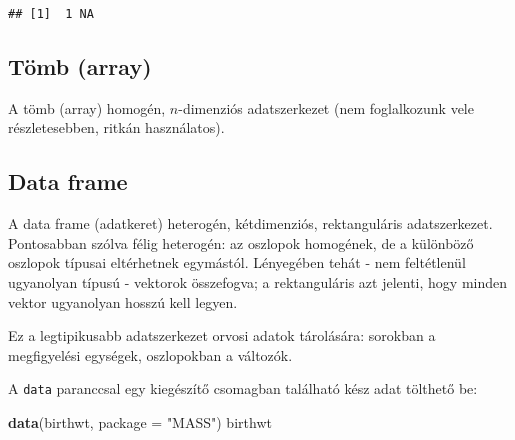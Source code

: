 \documentclass[]{book}
\newenvironment{Shaded}{\begin{snugshade}}{\end{snugshade}}
\newcommand{\KeywordTok}[1]{\textcolor[rgb]{0.13,0.29,0.53}{\textbf{#1}}}
\newcommand{\DataTypeTok}[1]{\textcolor[rgb]{0.13,0.29,0.53}{#1}}
\newcommand{\StringTok}[1]{\textcolor[rgb]{0.31,0.60,0.02}{#1}}
\newcommand{\NormalTok}[1]{#1}
\begin{document}
\begin{verbatim}
## [1]  1 NA
\end{verbatim}

\subsection{Tömb (array)}\label{tomb-array}

A tömb (array) homogén, \(n\)-dimenziós adatszerkezet (nem foglalkozunk
vele részletesebben, ritkán használatos).

\subsection{Data frame}\label{data-frame}

A data frame (adatkeret) heterogén, kétdimenziós, rektanguláris
adatszerkezet. Pontosabban szólva félig heterogén: az oszlopok
homogének, de a különböző oszlopok típusai eltérhetnek egymástól.
Lényegében tehát - nem feltétlenül ugyanolyan típusú - vektorok
összefogva; a rektanguláris azt jelenti, hogy minden vektor ugyanolyan
hosszú kell legyen.

Ez a legtipikusabb adatszerkezet orvosi adatok tárolására: sorokban a
megfigyelési egységek, oszlopokban a változók.

A \texttt{data} paranccsal egy kiegészítő csomagban található kész adat
tölthető be:

\begin{Shaded}
\begin{Highlighting}[]
\KeywordTok{data}\NormalTok{(birthwt, }\DataTypeTok{package =} \StringTok{"MASS"}\NormalTok{)}
\NormalTok{birthwt}
\end{Highlighting}
\end{Shaded}
\end{document}
